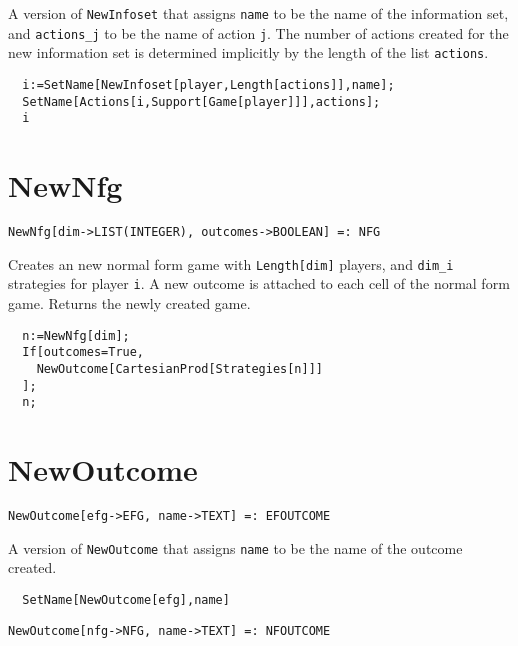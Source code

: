 \noindent
A version of \verb+NewInfoset+ that assigns \verb+name+ to be the name
of the information set, and \verb+actions_j+ to be the name of action
\verb+j+.  The number of actions created for the new information set
is determined implicitly by the length of the list \verb+actions+.  

\udfbody
\begin{verbatim}
  i:=SetName[NewInfoset[player,Length[actions]],name];
  SetName[Actions[i,Support[Game[player]]],actions];
  i
\end{verbatim} 


\section*{NewNfg}\label{ExtNewNfg}
\begin{verbatim}
NewNfg[dim->LIST(INTEGER), outcomes->BOOLEAN] =: NFG
\end{verbatim}

\noindent
Creates an new normal form game with \verb+Length[dim]+ players, and
\verb+dim_i+ strategies for player \verb+i+.  A new outcome is
attached to each cell of the normal form game.  Returns the newly
created game.

\udfbody
\begin{verbatim}
  n:=NewNfg[dim];
  If[outcomes=True,
    NewOutcome[CartesianProd[Strategies[n]]]
  ];
  n;
\end{verbatim} 


\section*{NewOutcome}\label{ExtNewOutcome}
\begin{verbatim}
NewOutcome[efg->EFG, name->TEXT] =: EFOUTCOME 
\end{verbatim}

\noindent
A version of \verb+NewOutcome+ that assigns \verb+name+ to be the name
of the outcome created.  

\udfbody
\begin{verbatim}
  SetName[NewOutcome[efg],name]
\end{verbatim} 

\newsignature

\begin{verbatim}
NewOutcome[nfg->NFG, name->TEXT] =: NFOUTCOME 
\end{verbatim}

